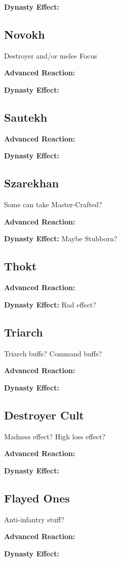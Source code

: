 \textbf{Dynasty Effect:}


\subsection{Novokh}

Destroyer and/or melee Focus

\textbf{Advanced Reaction:}

\textbf{Dynasty Effect:}

\subsection{Sautekh}

\textbf{Advanced Reaction:}

\textbf{Dynasty Effect:}


\subsection{Szarekhan}

Some can take Master-Crafted?

\textbf{Advanced Reaction:}

\textbf{Dynasty Effect:} Maybe Stubborn?


\subsection{Thokt}

\textbf{Advanced Reaction:}

\textbf{Dynasty Effect:} Rad effect?


\subsection{Triarch}

Triarch buffs? Command buffs?

\textbf{Advanced Reaction:}

\textbf{Dynasty Effect:}


\subsection{Destroyer Cult}

Madness effect? High loss effect?

\textbf{Advanced Reaction:}

\textbf{Dynasty Effect:}


\subsection{Flayed Ones}

Anti-infantry stuff?

\textbf{Advanced Reaction:}

\textbf{Dynasty Effect:}